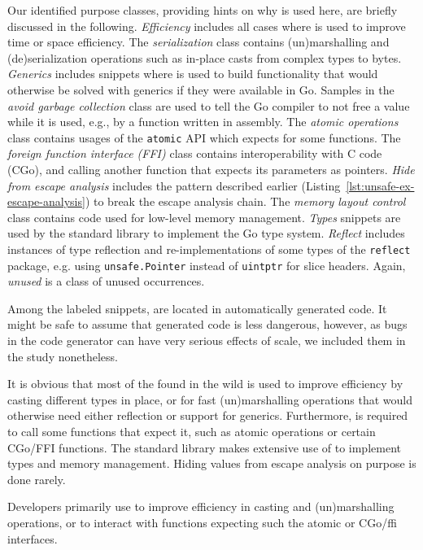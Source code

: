 Our identified purpose classes, providing hints on why \unsafe{} is used here, are briefly discussed in the following.
\textit{Efficiency} includes all cases where \unsafe{} is used to improve time or space efficiency.
The \textit{serialization} class contains (un)marshalling and (de)serialization operations such as in-place casts from complex types to bytes.
\textit{Generics} includes snippets where \unsafe{} is used to build functionality that would otherwise be solved with generics if they were available in Go.
Samples in the \textit{avoid garbage collection} class are used to tell the Go compiler to not free a value while it is used, e.g., by a function written in assembly.
The \textit{atomic operations} class contains usages of the \texttt{atomic} API which expects \unsafe{} for some functions.
The \textit{foreign function interface (FFI)} class contains interoperability with C code (CGo), and calling another function that expects its parameters as \unsafe{} pointers.
\textit{Hide from escape analysis} includes the pattern described earlier (Listing~\ref{lst:unsafe-ex-escape-analysis}) to break the escape analysis chain.
The \textit{memory layout control} class contains code used for low-level memory management.
\textit{Types} snippets are used by the standard library to implement the Go type system.
\textit{Reflect} includes instances of type reflection and re-implementations of some types of the \texttt{reflect} package, e.g. using \texttt{unsafe.Pointer} instead of \texttt{uintptr} for slice headers.
Again, \textit{unused} is a class of unused occurrences.

Among the  labeled snippets,  are located in automatically generated code.
It might be safe to assume that generated code is less dangerous, however, as bugs in the code generator can have very serious effects of scale, we included them in the study nonetheless.

It is obvious that most of the \unsafe{} found in the wild is used to improve efficiency by casting different types in place, or for fast (un)marshalling operations that would otherwise need either reflection or support for generics.
Furthermore, \unsafe{} is required to call some functions that expect it, such as atomic operations or certain CGo/FFI functions.
The standard library makes extensive use of \unsafe{} to implement types and memory management.
Hiding values from escape analysis on purpose is done rarely.

\begin{tcolorbox}[boxsep=1pt, enlarge top by=5pt, title=Answer to \ref{rq:purpose}]
Developers primarily use \unsafe{} to improve efficiency in casting and (un)marshalling operations, or to interact with functions expecting \unsafe{} such the atomic or CGo/ffi interfaces.
\end{tcolorbox}
